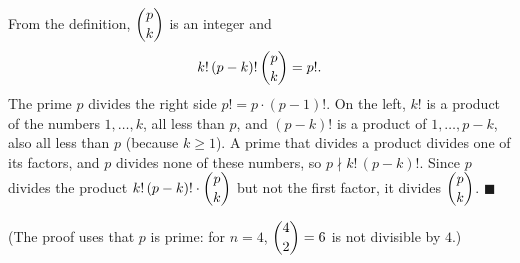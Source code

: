From the definition, $\dbinom pk$ is an integer and
\[
k!\,(p-k)!\,\dbinom pk=p! .
\]
The prime $p$ divides the right side $p!=p\cdot(p-1)!$. On the left, $k!$ is a product of the numbers $1,\dots,k$, all less than $p$, and $(p-k)!$ is a product of $1,\dots,p-k$, also all less than $p$ (because $k\ge1$). A prime that divides a product divides one of its factors, and $p$ divides none of these numbers, so $p\nmid k!\,(p-k)!$. Since $p$ divides the product $k!\,(p-k)!\cdot\dbinom pk$ but not the first factor, it divides $\dbinom pk$. $\blacksquare$

(The proof uses that $p$ is prime: for $n=4$, $\dbinom42=6$ is not divisible by $4$.)
